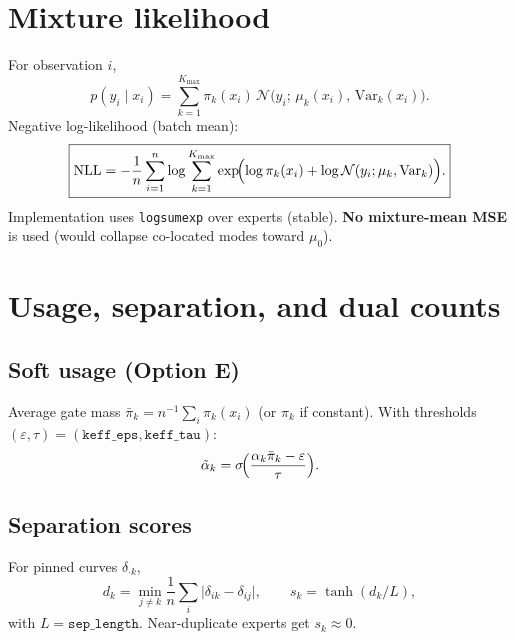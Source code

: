 \documentclass[11pt,a4paper]{article}
\newcommand{\Ncal}{\mathcal{N}}
\newcommand{\sigmoid}{\sigma}
\newcommand{\Kmax}{K_{\max}}
\begin{document}
\section{Mixture likelihood}

For observation \(i\),
\begin{equation}
  p(y_i\mid x_i)
  =
  \sum_{k=1}^{\Kmax}
  \pi_k(x_i)\,
  \Ncal\!\bigl(y_i;\,\mu_k(x_i),\,\mathrm{Var}_k(x_i)\bigr).
\end{equation}
Negative log-likelihood (batch mean):
\begin{equation}
  \boxed{
  \mathrm{NLL}
  =
  -
  \frac{1}{n}
  \sum_{i=1}^{n}
  \log\sum_{k=1}^{\Kmax}
  \exp\!\Bigl(
    \log\pi_k(x_i)
    +
    \log\Ncal(y_i;\mu_k,\mathrm{Var}_k)
  \Bigr).
  }
\end{equation}
Implementation uses \texttt{logsumexp} over experts (stable).
\textbf{No mixture-mean MSE} is used (would collapse co-located modes toward \(\mu_0\)).

\section{Usage, separation, and dual counts}

\subsection{Soft usage (Option E)}
Average gate mass \(\bar\pi_k=n^{-1}\sum_i\pi_k(x_i)\) (or \(\pi_k\) if constant).
With thresholds \((\varepsilon,\tau)=(\texttt{keff\_eps},\texttt{keff\_tau})\):
\begin{equation}
  \tilde\alpha_k
  =
  \sigmoid\!\Bigl(
    \frac{\alpha_k\bar\pi_k - \varepsilon}{\tau}
  \Bigr).
\end{equation}

\subsection{Separation scores}
For pinned curves \(\delta_{\cdot k}\),
\begin{equation}
  d_k
  =
  \min_{j\neq k}
  \frac{1}{n}\sum_i \lvert\delta_{ik}-\delta_{ij}\rvert,
  \qquad
  s_k
  =
  \tanh(d_k / L),
\end{equation}
with \(L=\texttt{sep\_length}\). Near-duplicate experts get \(s_k\approx 0\).
\end{document}
